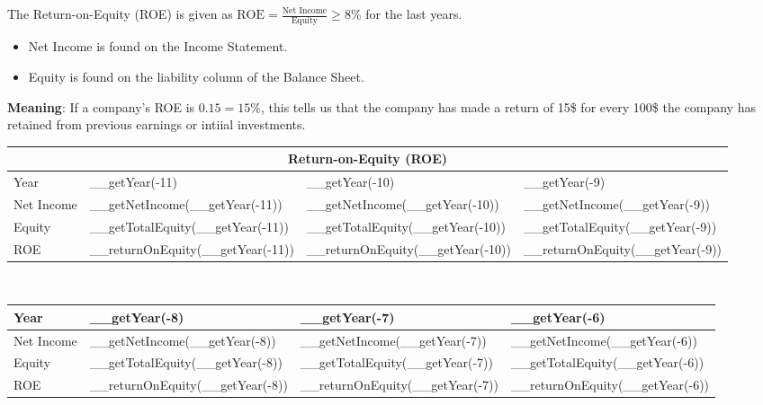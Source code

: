 The Return-on-Equity (ROE) is given as
$\text{ROE} = \frac{\text{Net Income}}{\text{Equity}} \geq 8\%$ for the last years.
\begin{itemize}
    \item Net Income is found on the Income Statement.
    \item Equity is found on the liability column of the Balance Sheet.
\end{itemize}
\textbf{Meaning}: If a company's ROE is $0.15 = 15\%$, this tells us that the company
has made a return of 15\$ for every 100\$ the company has retained from previous
earnings or intiial investments.\\

\begin{tabularx}{\textwidth}{|X|X|X|X|}
 \hline
 \multicolumn{4}{|c|}{Return-on-Equity (ROE)} \\
 \hline
 Year                     & __getYear(-11)                   & __getYear(-10)                   & __getYear(-9)                   \\
 \hline
 Net Income               & __getNetIncome(__getYear(-11))   & __getNetIncome(__getYear(-10))   & __getNetIncome(__getYear(-9))   \\
 Equity                   & __getTotalEquity(__getYear(-11)) & __getTotalEquity(__getYear(-10)) & __getTotalEquity(__getYear(-9)) \\
 \rowcolor{lightgray} ROE & __returnOnEquity(__getYear(-11)) & __returnOnEquity(__getYear(-10)) & __returnOnEquity(__getYear(-9)) \\
 \hline
\end{tabularx}\\

\begin{tabularx}{\textwidth}{|X|X|X|X|}
 \hline
 Year                     & __getYear(-8)                   & __getYear(-7)                   & __getYear(-6)                   \\
 \hline
 Net Income               & __getNetIncome(__getYear(-8))   & __getNetIncome(__getYear(-7))   & __getNetIncome(__getYear(-6))   \\
 Equity                   & __getTotalEquity(__getYear(-8)) & __getTotalEquity(__getYear(-7)) & __getTotalEquity(__getYear(-6)) \\
 \rowcolor{lightgray} ROE & __returnOnEquity(__getYear(-8)) & __returnOnEquity(__getYear(-7)) & __returnOnEquity(__getYear(-6)) \\
 \hline
\end{tabularx}\\

